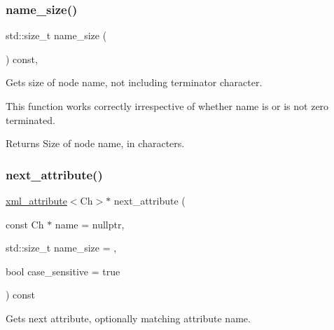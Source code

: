 \subsubsection{\texorpdfstring{name\+\_\+size()}{name\_size()}}
{\footnotesize\ttfamily std\+::size\+\_\+t name\+\_\+size (\begin{DoxyParamCaption}{ }\end{DoxyParamCaption}) const\hspace{0.3cm}{\ttfamily [inline]}, {\ttfamily [inherited]}}



Gets size of node name, not including terminator character. 

This function works correctly irrespective of whether name is or is not zero terminated. \begin{DoxyReturn}{Returns}
Size of node name, in characters. 
\end{DoxyReturn}
\mbox{\label{classrapidxml_1_1xml__attribute_a7393ae5940d5766aa90dc9f8f92465df}} 
\subsubsection{\texorpdfstring{next\+\_\+attribute()}{next\_attribute()}}
{\footnotesize\ttfamily \mbox{\hyperlink{classrapidxml_1_1xml__attribute}{xml\+\_\+attribute}}$<$Ch$>$$\ast$ next\+\_\+attribute (\begin{DoxyParamCaption}\item[{const Ch $\ast$}]{name = {\ttfamily nullptr},  }\item[{std\+::size\+\_\+t}]{name\+\_\+size = {},  }\item[{bool}]{case\+\_\+sensitive = {\ttfamily true} }\end{DoxyParamCaption}) const\hspace{0.3cm}{\ttfamily [inline]}}



Gets next attribute, optionally matching attribute name. 



